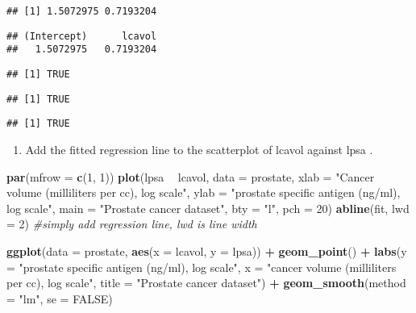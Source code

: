 \documentclass[]{book}
\newenvironment{Shaded}{\begin{snugshade}}{\end{snugshade}}
\newcommand{\CommentTok}[1]{\textcolor[rgb]{0.56,0.35,0.01}{\textit{#1}}}
\newcommand{\DataTypeTok}[1]{\textcolor[rgb]{0.13,0.29,0.53}{#1}}
\newcommand{\DecValTok}[1]{\textcolor[rgb]{0.00,0.00,0.81}{#1}}
\newcommand{\KeywordTok}[1]{\textcolor[rgb]{0.13,0.29,0.53}{\textbf{#1}}}
\newcommand{\NormalTok}[1]{#1}
\newcommand{\OperatorTok}[1]{\textcolor[rgb]{0.81,0.36,0.00}{\textbf{#1}}}
\newcommand{\OtherTok}[1]{\textcolor[rgb]{0.56,0.35,0.01}{#1}}
\newcommand{\StringTok}[1]{\textcolor[rgb]{0.31,0.60,0.02}{#1}}
\providecommand{\tightlist}{%
  \setlength{\itemsep}{0pt}\setlength{\parskip}{0pt}}
\theoremstyle{definition}
\theoremstyle{definition}
\theoremstyle{definition}
\theoremstyle{remark}
\begin{document}
\begin{verbatim}
## [1] 1.5072975 0.7193204
\end{verbatim}

\begin{verbatim}
## (Intercept)      lcavol 
##   1.5072975   0.7193204
\end{verbatim}

\begin{verbatim}
## [1] TRUE
\end{verbatim}

\begin{verbatim}
## [1] TRUE
\end{verbatim}

\begin{verbatim}
## [1] TRUE
\end{verbatim}

\begin{enumerate}
\def\labelenumi{\alph{enumi}.}
\setcounter{enumi}{5}
\tightlist
\item
  Add the fitted regression line to the scatterplot of lcavol against
  lpsa .
\end{enumerate}

\begin{Shaded}
\begin{Highlighting}[]
\KeywordTok{par}\NormalTok{(}\DataTypeTok{mfrow =} \KeywordTok{c}\NormalTok{(}\DecValTok{1}\NormalTok{, }\DecValTok{1}\NormalTok{))}
\KeywordTok{plot}\NormalTok{(lpsa }\OperatorTok{~}\StringTok{ }\NormalTok{lcavol, }\DataTypeTok{data =}\NormalTok{ prostate,}
  \DataTypeTok{xlab =} \StringTok{"Cancer volume (milliliters per cc), log scale"}\NormalTok{,}
  \DataTypeTok{ylab =} \StringTok{"prostate specific antigen (ng/ml), log scale"}\NormalTok{, }
  \DataTypeTok{main =} \StringTok{"Prostate cancer dataset"}\NormalTok{,}
  \DataTypeTok{bty =} \StringTok{"l"}\NormalTok{, }\DataTypeTok{pch =} \DecValTok{20}\NormalTok{)}
\KeywordTok{abline}\NormalTok{(fit, }\DataTypeTok{lwd =} \DecValTok{2}\NormalTok{) }\CommentTok{#simply add regression line, lwd is line width}
\end{Highlighting}
\end{Shaded}

\begin{Shaded}
\begin{Highlighting}[]
\KeywordTok{ggplot}\NormalTok{(}\DataTypeTok{data =}\NormalTok{ prostate, }\KeywordTok{aes}\NormalTok{(}\DataTypeTok{x =}\NormalTok{ lcavol, }\DataTypeTok{y =}\NormalTok{ lpsa)) }\OperatorTok{+}\StringTok{ }
\StringTok{  }\KeywordTok{geom_point}\NormalTok{() }\OperatorTok{+}
\StringTok{  }\KeywordTok{labs}\NormalTok{(}\DataTypeTok{y =} \StringTok{"prostate specific antigen (ng/ml), log scale"}\NormalTok{,}
       \DataTypeTok{x =} \StringTok{"cancer volume (milliliters per cc), log scale"}\NormalTok{,}
       \DataTypeTok{title =} \StringTok{"Prostate cancer dataset"}\NormalTok{) }\OperatorTok{+}\StringTok{ }
\StringTok{  }\KeywordTok{geom_smooth}\NormalTok{(}\DataTypeTok{method =} \StringTok{"lm"}\NormalTok{, }\DataTypeTok{se =} \OtherTok{FALSE}\NormalTok{)}
\end{Highlighting}
\end{Shaded}
\end{document}
